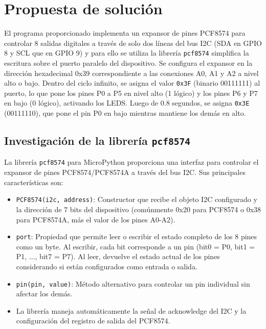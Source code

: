 \documentclass[letterpaper,12pt]{article}
\begin{document}
\section*{Propuesta de solución}

El programa proporcionado implementa un expansor de pines PCF8574 para controlar 8 salidas digitales a través de solo dos líneas del bus I2C (SDA en GPIO 8 y SCL que en GPIO 9) y para ello se utiliza la librería \texttt{pcf8574} simplifica la escritura sobre el puerto paralelo del dispositivo. Se configura el expansor en la dirección hexadecimal 0x39 correspondiente a las conexiones A0, A1 y A2 a nivel alto o bajo. Dentro del ciclo infinito, se asigna el valor \texttt{0x3F} (binario 00111111) al puerto, lo que pone los pines P0 a P5 en nivel alto (1 lógico) y los pines P6 y P7 en bajo (0 lógico), activando los LEDS. Luego de 0.8 segundos, se asigna \texttt{0x3E} (00111110), que pone el pin P0 en bajo mientras mantiene los demás en alto.

\subsection*{Investigación de la librería \texttt{pcf8574}}

La librer\'ia \texttt{pcf8574} para MicroPython proporciona una interfaz para controlar el expansor de pines PCF8574/PCF8574A a trav\'es del bus I2C. Sus principales caracter\'isticas son:

\begin{itemize}
    \item \texttt{PCF8574(i2c, address)}: Constructor que recibe el objeto I2C configurado y la direcci\'on de 7 bits del dispositivo (com\'unmente 0x20 para PCF8574 o 0x38 para PCF8574A, m\'as el valor de los pines A0-A2).
    \item \texttt{port}: Propiedad que permite leer o escribir el estado completo de los 8 pines como un byte. Al escribir, cada bit corresponde a un pin (bit0 = P0, bit1 = P1, ..., bit7 = P7). Al leer, devuelve el estado actual de los pines considerando si est\'an configurados como entrada o salida.
    \item \texttt{pin(pin, value)}: M\'etodo alternativo para controlar un pin individual sin afectar los dem\'as.
    \item La librer\'ia maneja autom\'aticamente la se\~nal de acknowledge del I2C y la configuraci\'on del registro de salida del PCF8574.
\end{itemize}
\end{document}
